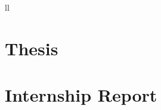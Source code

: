 \documentclass[
11pt, %
english,
singlespacing, %
headsepline, %
]{BachelorThesis} %
\begin{document}
\begin{abbreviations}{ll}
\end{abbreviations}


\mainmatter %

\pagestyle{thesis} %


\part{Thesis}

 

 
 



\part{Internship Report}

 

 
 




\printbibliography[title={References}]

\end{document}
